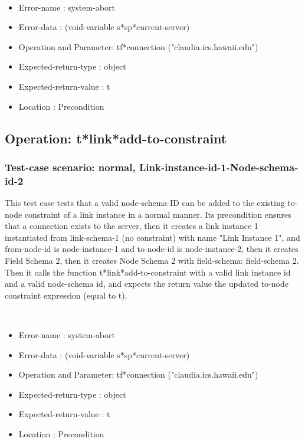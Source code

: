 \
\begin {itemize}
\item 	Error-name             : system-abort
\item Error-data             : (void-variable s*sp*current-server)
\item Operation and Parameter: tf*connection ("claudia.ics.hawaii.edu")
\item Expected-return-type   : object
\item Expected-return-value  : t
\item Location               : Precondition



\end {itemize}
\subsection {Operation: t*link*add-to-constraint}
\subsubsection {Test-case scenario: normal, Link-instance-id-1-Node-schema-id-2}


This test case tests that a valid node-schema-ID can be added to the existing to-node constraint of a link instance in a normal manner.
Its precondition ensures that a connection exists to the server, then it creates a link instance 1 instantiated from  link-schema-1 (no constraint) with name "Link Instance 1", and from-node-id is node-instance-1 and to-node-id is node-instance-2, then it creates Field Schema 2, then it creates Node Schema 2 with field-schema: field-schema 2.
Then it calls the function t*link*add-to-constraint  with a valid link instance id and a valid node-schema id, and expects the return value the updated to-node constraint expression (equal to t).



\
\begin {itemize}
\item 	Error-name             : system-abort
\item Error-data             : (void-variable s*sp*current-server)
\item Operation and Parameter: tf*connection ("claudia.ics.hawaii.edu")
\item Expected-return-type   : object
\item Expected-return-value  : t
\item Location               : Precondition



\end {itemize}
